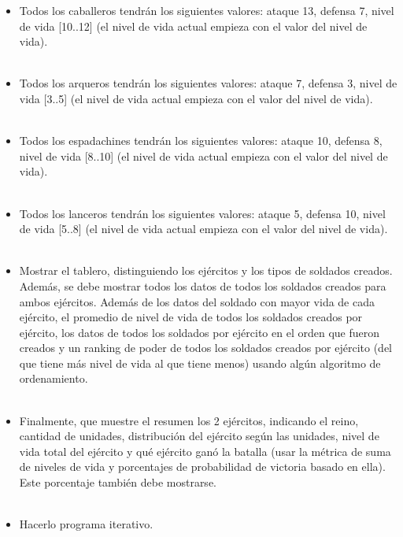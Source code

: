 \documentclass{article}
\begin{document}
\begin{itemize}
\begin{itemize}
        \\
        \\
        \item Todos los caballeros tendrán los siguientes valores: ataque 13, defensa 7, nivel de vida [10..12] (el nivel de vida actual empieza con el valor del nivel de vida).
        \\
        \\
        \item Todos los arqueros tendrán los siguientes valores: ataque 7, defensa 3, nivel de vida [3..5] (el nivel de vida actual empieza con el valor del nivel de vida).
        \\
        \\
        \item Todos los espadachines tendrán los siguientes valores: ataque 10, defensa 8, nivel de vida [8..10] (el nivel de vida actual empieza con el valor del nivel de vida).
        \\
        \\
        \item Todos los lanceros tendrán los siguientes valores: ataque 5, defensa 10, nivel de vida [5..8] (el nivel de vida actual empieza con el valor del nivel de vida).
        \\
        \\
        \item Mostrar el tablero, distinguiendo los ejércitos y los tipos de soldados creados. Además, se debe mostrar todos los datos de todos los soldados creados para ambos ejércitos. Además de los datos del soldado con mayor vida de cada ejército, el promedio de nivel de vida de todos los soldados creados por ejército, los datos de todos los soldados por ejército en el orden que fueron creados y un ranking de poder de todos los soldados creados por ejército (del que tiene más nivel de vida al que tiene menos) usando algún algoritmo de ordenamiento.
        \\
        \\
        \item Finalmente, que muestre el resumen los 2 ejércitos, indicando el reino, cantidad de unidades, distribución del ejército según las unidades, nivel de vida total del ejército y qué ejército ganó la batalla (usar la métrica de suma de niveles de vida y porcentajes de probabilidad de victoria basado en ella). Este porcentaje también debe mostrarse.
        \\
        \\
        \item Hacerlo programa iterativo.
        \\
        \\
      

\end{itemize}
\end{itemize}
\end{document}
